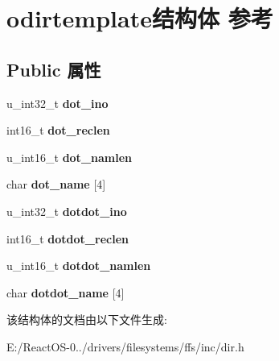 \hypertarget{structodirtemplate}{}\section{odirtemplate结构体 参考}
\label{structodirtemplate}
\subsection*{Public 属性}
\begin{DoxyCompactItemize}
\item 
\mbox{\label{structodirtemplate_accb1a32a9906a4e1807783336871dcaa}} 
u\+\_\+int32\+\_\+t {\bfseries dot\+\_\+ino}
\item 
\mbox{\label{structodirtemplate_a1e534ec0b4615bf0bc88dae0995786ad}} 
int16\+\_\+t {\bfseries dot\+\_\+reclen}
\item 
\mbox{\label{structodirtemplate_a38394c7a85040094a52b2382a1294a68}} 
u\+\_\+int16\+\_\+t {\bfseries dot\+\_\+namlen}
\item 
\mbox{\label{structodirtemplate_a90f98a017b7adedef5b4d5911f91b2ed}} 
char {\bfseries dot\+\_\+name} \mbox{[}4\mbox{]}
\item 
\mbox{\label{structodirtemplate_a5abbd3da3ae45e4ace5febbcc383f4bc}} 
u\+\_\+int32\+\_\+t {\bfseries dotdot\+\_\+ino}
\item 
\mbox{\label{structodirtemplate_add75d8cd7a289a4930bbfe5db1eaf172}} 
int16\+\_\+t {\bfseries dotdot\+\_\+reclen}
\item 
\mbox{\label{structodirtemplate_ac15c99f88e0440790a146295d6a48531}} 
u\+\_\+int16\+\_\+t {\bfseries dotdot\+\_\+namlen}
\item 
\mbox{\label{structodirtemplate_a9ee611d91c6aabd4fffb9d4548a288a5}} 
char {\bfseries dotdot\+\_\+name} \mbox{[}4\mbox{]}
\end{DoxyCompactItemize}


该结构体的文档由以下文件生成\+:\begin{DoxyCompactItemize}
\item 
E\+:/\+React\+O\+S-\/0../drivers/filesystems/ffs/inc/dir.\+h\end{DoxyCompactItemize}
